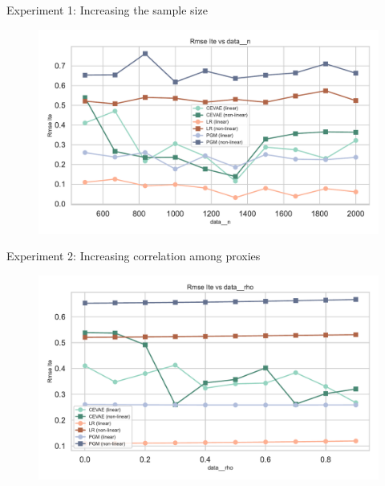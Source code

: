 \documentclass[10pt]{beamer}
\begin{document}
\begin{frame}{Experiment 1: Increasing the sample size}
  \begin{figure}[H]
      \includegraphics[width=\textwidth]{images/MyRun_data__n--rmse_ite.pdf}
    \end{figure}
\end{frame}

\begin{frame}{Experiment 2: Increasing correlation among proxies}
  \begin{figure}[H]
      \includegraphics[width=\textwidth]{images/MyRun_data__rho--rmse_ite.pdf}
    \end{figure}
\end{frame}
\end{document}
